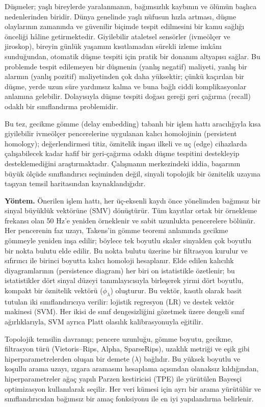 Düşmeler; yaşlı bireylerde yaralanmanın, bağımsızlık kaybının ve ölümün başlıca
nedenlerinden biridir. Dünya genelinde yaşlı nüfusun hızla artması, düşme olaylarının
zamanında ve güvenilir biçimde tespit edilmesini bir kamu sağlığı önceliği hâline
getirmektedir. Giyilebilir ataletsel sensörler (ivmeölçer ve jiroskop), bireyin günlük
yaşamını kısıtlamadan sürekli izleme imkânı sunduğundan, otomatik düşme tespiti için
pratik bir donanım altyapısı sağlar. Bu problemde tespit edilemeyen bir düşmenin
(yanlış negatif) maliyeti, yanlış bir alarmın (yanlış pozitif) maliyetinden çok daha
yüksektir; çünkü kaçırılan bir düşme, yerde uzun süre yardımsız kalma ve buna bağlı
ciddi komplikasyonlar anlamına gelebilir. Dolayısıyla düşme tespiti doğası gereği geri
çağırma (recall) odaklı bir sınıflandırma problemidir.

Bu tez, gecikme gömme (delay embedding) tabanlı bir işlem hattı aracılığıyla kısa
giyilebilir ivmeölçer pencerelerine uygulanan kalıcı homolojinin (persistent homology);
değerlendirmesi titiz, öznitelik inşası ilkeli ve uç (edge) cihazlarda çalışabilecek
kadar hafif bir geri-çağırma odaklı düşme tespitini destekleyip desteklemediğini
araştırmaktadır. Çalışmanın merkezindeki iddia, başarının büyük ölçüde sınıflandırıcı
seçiminden değil, sinyali topolojik bir öznitelik uzayına taşıyan temsil haritasından
kaynaklandığıdır.

\vspace{2mm}
\noindent\textbf{Yöntem.}
Önerilen işlem hattı, her üç-eksenli kaydı önce yönelimden bağımsız bir sinyal büyüklük
vektörüne (SMV) dönüştürür. Tüm kayıtlar ortak bir örnekleme frekansı olan 50 Hz'e
yeniden örneklenir ve sabit uzunlukta pencerelere bölünür. Her pencerenin faz uzayı,
Takens'in gömme teoremi anlamında gecikme gömmeyle yeniden inşa edilir; böylece tek
boyutlu skaler sinyalden çok boyutlu bir nokta bulutu elde edilir. Bu nokta bulutu
üzerine bir filtrasyon kurulur ve sıfırıncı ile birinci boyutta kalıcı homoloji
hesaplanır. Elde edilen kalıcılık diyagramlarının (persistence diagram) her biri on
istatistikle özetlenir; bu istatistikler dört sinyal düzeyi tanımlayıcısıyla birleşerek
yirmi dört boyutlu, kompakt bir öznitelik vektörü ($\phi_\lambda$) oluşturur. Bu vektör,
kasıtlı olarak basit tutulan iki sınıflandırıcıya verilir: lojistik regresyon (LR) ve
destek vektör makinesi (SVM). Her ikisi de sınıf dengesizliğini gözetmek üzere dengeli
sınıf ağırlıklarıyla, SVM ayrıca Platt olasılık kalibrasyonuyla eğitilir.

Topolojik temsilin davranışı; pencere uzunluğu, gömme boyutu, gecikme, filtrasyon türü
(Vietoris--Rips, Alpha, SparseRips), uzaklık metriği ve eşik gibi hiperparametrelerden
oluşan bir demete ($\lambda$) bağlıdır. Bu yüksek boyutlu ve koşullu arama uzayı,
ızgara aramasını hesaplama açısından olanaksız kıldığından, hiperparametreler ağaç
yapılı Parzen kestiricisi (TPE) ile yürütülen Bayesçi optimizasyon kullanılarak
seçilir. Her veri kümesi için ayrı bir arama yürütülür ve sınıflandırıcıdan bağımsız
bir amaç fonksiyonu ile en iyi yapılandırma belirlenir.

